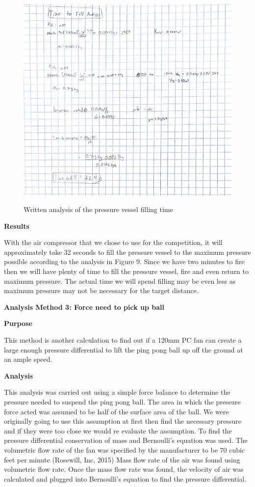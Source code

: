 \documentclass[12pt,letterpaper,titlepage]{article}
\begin{document}
\begin{figure}[H]
	\centering
	\includegraphics[width=\textwidth]{images/fill}
	\label{fig:fill}
	\caption{Written analysis of the pressure vessel filling time}
\end{figure}


\smallskip\noindent\textbf{Results}

With the air compressor that we chose to use for the competition, it will approximately take 32 seconds to fill the pressure vessel to the maximum pressure possible according to the analysis in Figure 9. Since we have two minutes to fire then we will have plenty of time to fill the pressure vessel, fire and even return to maximum pressure. The actual time we will spend filling may be even less as maximum pressure may not be necessary for the target distance.

\bigskip\noindent\textbf{Analysis Method 3: Force need to pick up ball}

\medskip\noindent\textbf{Purpose}

This method is another calculation to find out if a 120mm PC fan can create a large enough pressure differential to lift the ping pong ball up off the ground at an ample speed. 

\smallskip\noindent\textbf{Analysis}

This analysis was carried out using a simple force balance to determine the pressure needed to suspend the ping pong ball. The area in which the pressure force acted was assumed to be half of the surface area of the ball. We were originally going to use this assumption at first then find the necessary pressure and if they were too close we would re evaluate the assumption. To find the pressure differential conservation of mass and Bernoulli's equation was used. The volumetric flow rate of the fan was specified by the manufacturer to be 70 cubic feet per minute (Rosewill, Inc, 2015) Mass flow rate of the air was found using volumetric flow rate. Once the mass flow rate was found, the velocity of air was calculated and plugged into Bernoulli's equation to find the pressure differential. 
\end{document}
